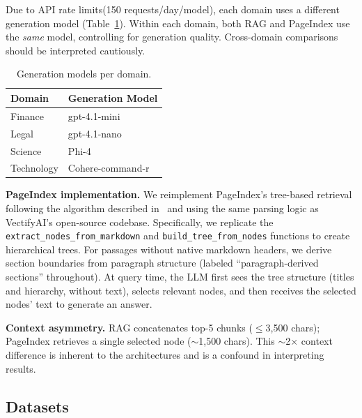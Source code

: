 \documentclass[journal]{IEEEtran}
\begin{document}
Due to API rate limits(150 requests/day/model), each domain uses a different generation model (Table~\ref{tab:models}). Within each domain, both RAG and PageIndex use the \emph{same} model, controlling for generation quality. Cross-domain comparisons should be interpreted cautiously.

\begin{table}[!ht]
\caption{Generation models per domain.}
\label{tab:models}
\centering
\small
\begin{tabular}{ll}
\toprule
Domain & Generation Model \\
\midrule
Finance & gpt-4.1-mini \\
Legal & gpt-4.1-nano \\
Science & Phi-4 \\
Technology & Cohere-command-r \\
\bottomrule
\end{tabular}
\end{table}

\textbf{PageIndex implementation.} We reimplement PageIndex's tree-based retrieval following the algorithm described in~\cite{pageindex} and using the same parsing logic as VectifyAI's open-source codebase. Specifically, we replicate the \texttt{extract\_nodes\_from\_markdown} and \texttt{build\_tree\_from\_nodes} functions to create hierarchical trees. For passages without native markdown headers, we derive section boundaries from paragraph structure (labeled ``paragraph-derived sections'' throughout). At query time, the LLM first sees the tree structure (titles and hierarchy, without text), selects relevant nodes, and then receives the selected nodes' text to generate an answer.

\textbf{Context asymmetry.} RAG concatenates top-5 chunks ($\leq$3,500 chars); PageIndex retrieves a single selected node ($\sim$1,500 chars). This $\sim$2$\times$ context difference is inherent to the architectures and is a confound in interpreting results.

\subsection{Datasets}

\begin{table}[!ht]
\caption{Evaluation datasets. All provide pre-extracted evidence passages, not full documents.}
\label{tab:datasets}
\centering
{}
\end{table}
\end{document}
